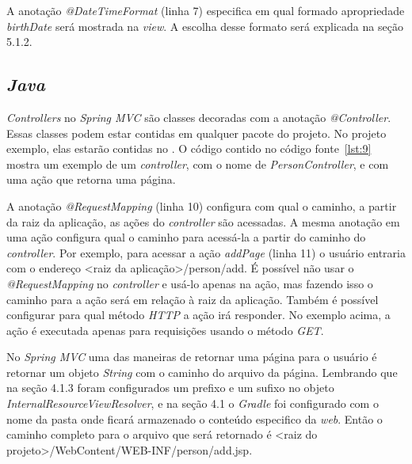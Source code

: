 
A anotação \textit{@DateTimeFormat} (linha 7) especifica em qual formado apropriedade \textit{birthDate} será mostrada na \textit{view}. A escolha desse formato será explicada na seção 5.1.2.


\subsection{\textit{Java}}

\textit{Controllers} no \textit{Spring MVC} são classes decoradas com a anotação \textit{@Controller}. Essas classes podem estar contidas em qualquer pacote do projeto. No projeto exemplo, elas estarão contidas no . O código contido no código fonte~\ref{lst:9} mostra um exemplo de um \textit{controller}, com o nome de \textit{PersonController}, e com uma ação que retorna uma página.


A anotação \textit{@RequestMapping} (linha 10) configura com qual o caminho, a partir da raiz da aplicação, as ações do \textit{controller} são acessadas. A mesma anotação em uma ação configura qual o caminho para acessá-la a partir do caminho do \textit{controller}. Por exemplo, para acessar a ação \textit{addPage} (linha 11) o usuário entraria com o endereço <raiz da aplicação>/person/add. É possível não usar o \textit{@RequestMapping} no \textit{controller} e usá-lo apenas na ação, mas fazendo isso o caminho para a ação será em relação à raiz da aplicação. Também é possível configurar para qual método \textit{HTTP} a ação irá responder. No exemplo acima, a ação é executada apenas para requisições usando o método \textit{GET}.

No \textit{Spring MVC} uma das maneiras de retornar uma página para o usuário é retornar um objeto \textit{String} com o caminho do arquivo da página. Lembrando que na seção 4.1.3 foram configurados um prefixo e um sufixo no objeto \textit{InternalResourceViewResolver}, e na seção 4.1 o \textit{Gradle} foi configurado com o nome da pasta onde ficará armazenado o conteúdo especifico da \textit{web}. Então o caminho completo para o arquivo que será retornado é <raiz do projeto>/WebContent/WEB-INF/person/add.jsp.

